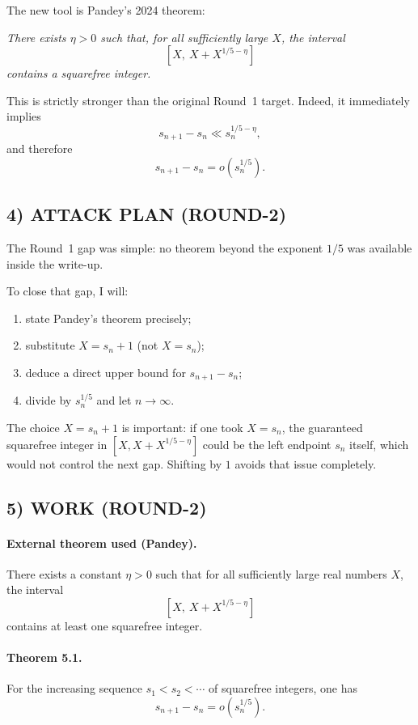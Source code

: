The new tool is Pandey's 2024 theorem:

\medskip

\emph{There exists $\eta>0$ such that, for all sufficiently large $X$, the interval}
\[
[X,\ X+X^{1/5-\eta}]
\]
\emph{contains a squarefree integer.}

\medskip

This is strictly stronger than the original Round~1 target. Indeed, it immediately implies
\[
s_{n+1}-s_n\ll s_n^{1/5-\eta},
\]
and therefore
\[
s_{n+1}-s_n=o(s_n^{1/5}).
\]

\subsection*{4) ATTACK PLAN (ROUND-2)}

The Round~1 gap was simple: no theorem beyond the exponent $1/5$ was available inside the write-up.

To close that gap, I will:

\begin{enumerate}
\item state Pandey's theorem precisely;
\item substitute $X=s_n+1$ (not $X=s_n$);
\item deduce a direct upper bound for $s_{n+1}-s_n$;
\item divide by $s_n^{1/5}$ and let $n\to \infty$.
\end{enumerate}

The choice $X=s_n+1$ is important: if one took $X=s_n$, the guaranteed squarefree integer in $[X,X+X^{1/5-\eta}]$ could be the left endpoint $s_n$ itself, which would not control the next gap. Shifting by $1$ avoids that issue completely.

\subsection*{5) WORK (ROUND-2)}

\paragraph{External theorem used (Pandey).}
There exists a constant $\eta>0$ such that for all sufficiently large real numbers $X$, the interval
\[
[X,\ X+X^{1/5-\eta}]
\]
contains at least one squarefree integer.

\paragraph{Theorem 5.1.}
For the increasing sequence $s_1<s_2<\cdots$ of squarefree integers, one has
\[
s_{n+1}-s_n=o(s_n^{1/5}).
\]

